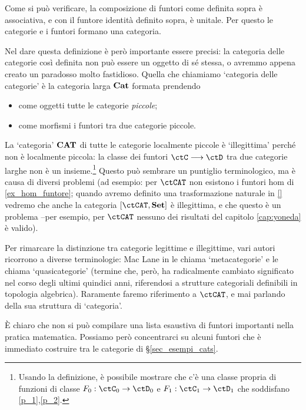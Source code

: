 \begin{definition}\label{ex_cat_cat}
	Come si può verificare, la composizione di funtori come definita sopra è associativa, e con il funtore identità definito sopra, è unitale. Per questo le categorie e i funtori formano una categoria.

	Nel dare questa definizione è però importante essere precisi: la categoria delle categorie così definita non può essere un oggetto di sé stessa, o avremmo appena creato un paradosso molto fastidioso. Quella che chiamiamo `categoria delle categorie' è la categoria larga \(\mathbf{Cat}\)  formata prendendo
	\begin{itemize}
		\item come oggetti tutte le categorie \emph{piccole};
		\item come morfismi i funtori tra due categorie piccole.
	\end{itemize}
\end{definition}
\begin{remark}
La `categoria' \(\mathbf{CAT}\) di tutte le categorie localmente piccole è `illegittima' perché non è localmente piccola: la classe dei funtori \(\ctC \fun\ctD\) tra due categorie larghe non è un insieme.\footnote{Usando la definizione, è possibile mostrare che c'è una classe propria di funzioni di classe \(F_0 : \ctC_0 \to \ctD_0\) e \(F_1 : \ctC_1 \to \ctD_1\) che soddisfano \ref{p_1},\ref{p_2}.} Questo può sembrare un puntiglio terminologico, ma è causa di diversi problemi (ad esempio: per \(\ctCAT\) non esistono i funtori hom di \ref{ex_hom_funtore}; quando avremo definito una trasformazione naturale in \ref{} vedremo che anche la categoria \([\ctCAT,\ctSet]\) è illegittima, e che questo è un problema --per esempio, per \(\ctCAT\) nessuno dei risultati del capitolo \ref{cap:yoneda} è valido).

Per rimarcare la distinzione tra categorie legittime e illegittime, vari autori ricorrono a diverse terminologie: Mac Lane in \cite{working-categories} le chiama `metacategorie' e \cite{acc} le chiama `quasicategorie' (termine che, però, ha radicalmente cambiato significato nel corso degli ultimi quindici anni, riferendosi a strutture categoriali definibili in topologia algebrica). Raramente faremo riferimento a \(\ctCAT\), e mai parlando della sua struttura di `categoria'.
\end{remark}
\`E chiaro che non si può compilare una lista esaustiva di funtori importanti nella pratica matematica. Possiamo però concentrarci su alcuni funtori che è immediato costruire tra le categorie di §\ref{sec_esempi_cats}.
